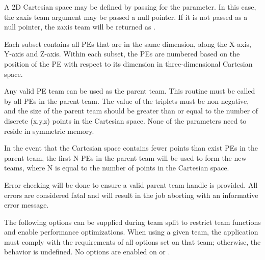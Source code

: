 \begin{apidefinition}
{A 2D Cartesian space may be defined by passing  for the 
parameter. In this case, the zaxis team argument may be passed a null
pointer. If it is not passed as a null pointer, the zaxis team will be returned
as .

Each subset contains all \acp{PE} that are in the same
dimension, along the X-axis, Y-axis and Z-axis. Within each subset,
the \acp{PE} are numbered based on the position of the \ac{PE} with respect to its
dimension in three-dimensional Cartesian space.

Any valid \ac{PE} team can be used as the parent team. This routine must be
called by all \acp{PE} in the parent team. The value of the triplets must be
non-negative, and the size of the parent team should be greater than or
equal to the number of discrete (x,y,z) points in the Cartesian space.
None of the parameters need to reside in symmetric memory.

In the event that the Cartesian space contains fewer points than exist \acp{PE}
in the parent team, the first N \acp{PE} in the parent team will be used
to form the new teams, where N is equal to the number of points in the
Cartesian space.

Error checking will be done to ensure a valid parent team handle is provided.
All errors are considered fatal and will result in the job aborting with
an informative error message.

The following options can be supplied during team split to restrict
team functions and enable performance optimizations.  When using a given
team, the application must comply with the requirements of all options
set on that team; otherwise, the behavior is undefined.
No options are enabled on  or .

}



\begin{apiexamples}

\end{apiexamples}

\end{apidefinition}
